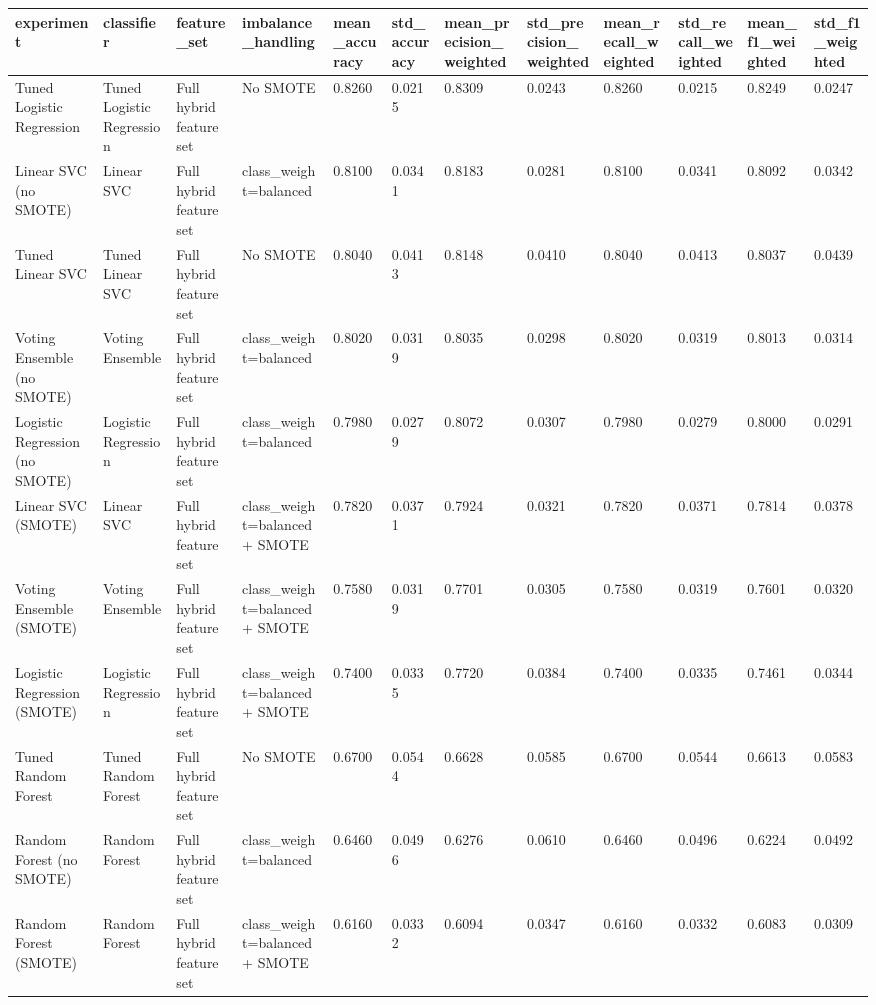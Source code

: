 \begin{tabular}{llllllllllll}
\toprule
experiment & classifier & feature\_set & imbalance\_handling & mean\_accuracy & std\_accuracy & mean\_precision\_weighted & std\_precision\_weighted & mean\_recall\_weighted & std\_recall\_weighted & mean\_f1\_weighted & std\_f1\_weighted \\
\midrule
Tuned Logistic Regression & Tuned Logistic Regression & Full hybrid feature set & No SMOTE & 0.8260 & 0.0215 & 0.8309 & 0.0243 & 0.8260 & 0.0215 & 0.8249 & 0.0247 \\
Linear SVC (no SMOTE) & Linear SVC & Full hybrid feature set & class\_weight=balanced & 0.8100 & 0.0341 & 0.8183 & 0.0281 & 0.8100 & 0.0341 & 0.8092 & 0.0342 \\
Tuned Linear SVC & Tuned Linear SVC & Full hybrid feature set & No SMOTE & 0.8040 & 0.0413 & 0.8148 & 0.0410 & 0.8040 & 0.0413 & 0.8037 & 0.0439 \\
Voting Ensemble (no SMOTE) & Voting Ensemble & Full hybrid feature set & class\_weight=balanced & 0.8020 & 0.0319 & 0.8035 & 0.0298 & 0.8020 & 0.0319 & 0.8013 & 0.0314 \\
Logistic Regression (no SMOTE) & Logistic Regression & Full hybrid feature set & class\_weight=balanced & 0.7980 & 0.0279 & 0.8072 & 0.0307 & 0.7980 & 0.0279 & 0.8000 & 0.0291 \\
Linear SVC (SMOTE) & Linear SVC & Full hybrid feature set & class\_weight=balanced + SMOTE & 0.7820 & 0.0371 & 0.7924 & 0.0321 & 0.7820 & 0.0371 & 0.7814 & 0.0378 \\
Voting Ensemble (SMOTE) & Voting Ensemble & Full hybrid feature set & class\_weight=balanced + SMOTE & 0.7580 & 0.0319 & 0.7701 & 0.0305 & 0.7580 & 0.0319 & 0.7601 & 0.0320 \\
Logistic Regression (SMOTE) & Logistic Regression & Full hybrid feature set & class\_weight=balanced + SMOTE & 0.7400 & 0.0335 & 0.7720 & 0.0384 & 0.7400 & 0.0335 & 0.7461 & 0.0344 \\
Tuned Random Forest & Tuned Random Forest & Full hybrid feature set & No SMOTE & 0.6700 & 0.0544 & 0.6628 & 0.0585 & 0.6700 & 0.0544 & 0.6613 & 0.0583 \\
Random Forest (no SMOTE) & Random Forest & Full hybrid feature set & class\_weight=balanced & 0.6460 & 0.0496 & 0.6276 & 0.0610 & 0.6460 & 0.0496 & 0.6224 & 0.0492 \\
Random Forest (SMOTE) & Random Forest & Full hybrid feature set & class\_weight=balanced + SMOTE & 0.6160 & 0.0332 & 0.6094 & 0.0347 & 0.6160 & 0.0332 & 0.6083 & 0.0309 \\
\bottomrule
\end{tabular}
